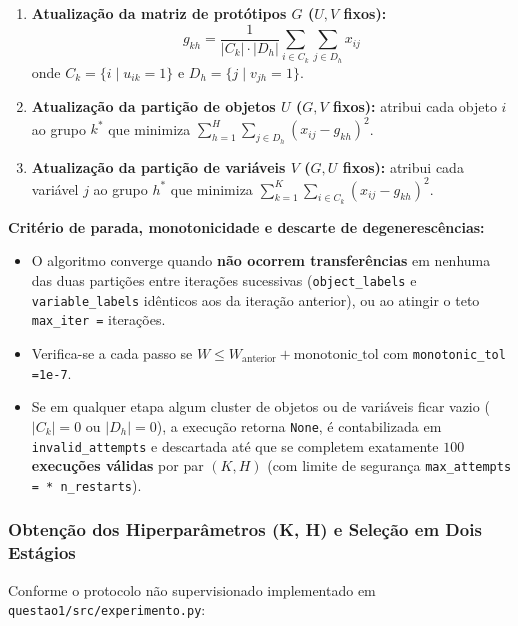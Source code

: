 \documentclass[a4paper,11pt]{article}
\begin{document}
\begin{enumerate}[leftmargin=1.5em, itemsep=0.25em, topsep=0.25em]
  \item \textbf{Atualização da matriz de protótipos $G$ ($U, V$ fixos):}
\[
g_{kh} = \frac{1}{|C_k| \cdot |D_h|} \sum_{i \in C_k} \sum_{j \in D_h} x_{ij}
\]
onde $C_k = \{i \mid u_{ik} = 1\}$ e $D_h = \{j \mid v_{jh} = 1\}$.
  \item \textbf{Atualização da partição de objetos $U$ ($G, V$ fixos):} atribui cada objeto $i$ ao grupo $k^*$ que minimiza $\sum_{h=1}^H \sum_{j \in D_h} (x_{ij} - g_{kh})^2$.
  \item \textbf{Atualização da partição de variáveis $V$ ($G, U$ fixos):} atribui cada variável $j$ ao grupo $h^*$ que minimiza $\sum_{k=1}^K \sum_{i \in C_k} (x_{ij} - g_{kh})^2$.
\end{enumerate}
\textbf{Critério de parada, monotonicidade e descarte de degenerescências:}
\begin{itemize}[leftmargin=1.5em, itemsep=0.25em, topsep=0.25em]
  \item O algoritmo converge quando \textbf{não ocorrem transferências} em nenhuma das duas partições entre iterações sucessivas (\texttt{object\_\allowbreak labels} e \texttt{variable\_\allowbreak labels} idênticos aos da iteração anterior), ou ao atingir o teto \texttt{max\_\allowbreak iter =} iterações.
  \item Verifica-se a cada passo se $W \le W_{\text{anterior}} + \text{monotonic\_tol}$ com \texttt{monotonic\_\allowbreak tol =\allowbreak  1e-7}.
  \item Se em qualquer etapa algum cluster de objetos ou de variáveis ficar vazio ($|C_k| = 0$ ou $|D_h| = 0$), a execução retorna \texttt{None}, é contabilizada em \texttt{invalid\_\allowbreak attempts} e descartada até que se completem exatamente \textbf{$100$ execuções válidas} por par $(K, H)$ (com limite de segurança \texttt{max\_\allowbreak attempts = * n\_\allowbreak restarts}).
\end{itemize}
\subsubsection{Obtenção dos Hiperparâmetros (K, H) e Seleção em Dois Estágios}\label{sec:2-1-2-obtencao-dos-hiperparametros-k-h-e-selecao-em-dois-estagios}


Conforme o protocolo não supervisionado implementado em \texttt{questao1/\allowbreak src/\allowbreak experimento.py}:
\end{document}
